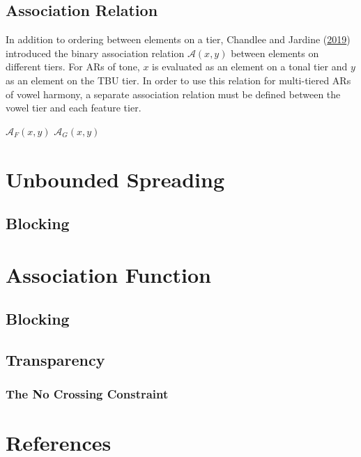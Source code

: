 \documentclass[,doc,floatsintext]{apa6}
\theoremstyle{definition}
\theoremstyle{definition}
\theoremstyle{definition}
\theoremstyle{remark}
\begin{document}
\subsection{Association Relation}\label{association-relation}

In addition to ordering between elements on a tier, Chandlee and Jardine
(\protect\hyperlink{ref-chandleejardineaisl}{2019}) introduced the
binary association relation \(\mathcal{A}(x, y)\) between elements on
different tiers. For ARs of tone, \(x\) is evaluated as an element on a
tonal tier and \(y\) as an element on the TBU tier. In order to use this
relation for multi-tiered ARs of vowel harmony, a separate association
relation must be defined between the vowel tier and each feature tier.

\begin{exe}
\ex $\mathcal{A}_F(x, y)$
\ex $\mathcal{A}_G(x, y)$
\end{exe}

\section{Unbounded Spreading}\label{unbounded-spreading}

\subsection{Blocking}\label{blocking}

\section{Association Function}\label{association-function}

\subsection{Blocking}\label{blocking-1}

\subsection{Transparency}\label{transparency}

\subsubsection{The No Crossing
Constraint}\label{the-no-crossing-constraint}

\newpage

\section{References}\label{references}
\end{document}

